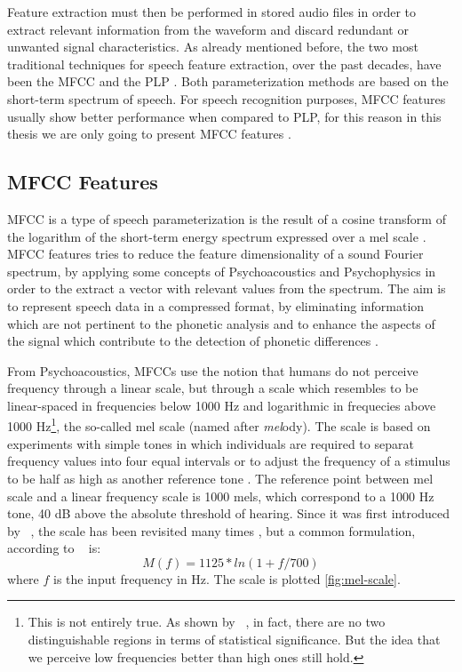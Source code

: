 Feature extraction must then be performed in stored audio files in order to extract relevant information from the waveform and discard redundant or unwanted signal characteristics. As already mentioned before, the two most traditional techniques for speech feature extraction, over the past decades, have been the \ac{MFCC} \cite{Davis1980} and the \ac{PLP} \cite{Hermansky1990}. Both parameterization methods are based on the short-term spectrum of speech. For speech recognition purposes, \ac{MFCC} features usually show better performance when compared to \ac{PLP}, for this reason in this thesis we are only going to present \ac{MFCC} features \cite{Mporas2007}.

\subsection{MFCC Features}

\ac{MFCC} is a type of speech parameterization is the result of a cosine transform of the logarithm of the short-term energy spectrum expressed over a mel scale \cite{Davis1980}. \ac{MFCC} features tries to reduce the feature dimensionality of a sound Fourier spectrum, by applying some concepts of Psychoacoustics and Psychophysics in order to the extract a vector with relevant values from the spectrum. The aim is to represent speech data in a compressed format, by eliminating information which are not pertinent to the phonetic analysis and to enhance the aspects of the signal which contribute to the detection of phonetic differences \cite{Davis1980}.

From Psychoacoustics, \ac{MFCC}s use the notion that humans do not perceive frequency through a linear scale, but through a scale which resembles to be linear-spaced in frequencies below 1000 Hz and logarithmic in frequecies above 1000 Hz\footnote{This is not entirely true. As shown by \citet{Umesh1999}~\cite{Umesh1999}, in fact, there are no two distinguishable regions in terms of statistical significance. But the idea that we perceive low frequencies better than high ones still hold.}, the so-called mel scale (named after \emph{mel}ody). The scale is based on experiments with simple tones in which individuals are required to separat frequency values into four equal intervals or to adjust the frequency of a stimulus to be half as high as another reference tone \cite{Huang2001}. The reference point between mel scale and a linear frequency scale is 1000 mels, which correspond to a 1000 Hz tone, 40 dB above the absolute threshold of hearing. Since it was first introduced by \citet{Stevens1937}~\cite{Stevens1937}, the scale has been revisited many times \cite{Umesh1999}, but a common formulation, according to \citet{Huang2001}~\cite{Huang2001} is:
\begin{equation}
 M(f) = 1125*ln(1 + f / 700)
\end{equation}
where $f$ is the input frequency in Hz. The scale is plotted \autoref{fig:mel-scale}.

